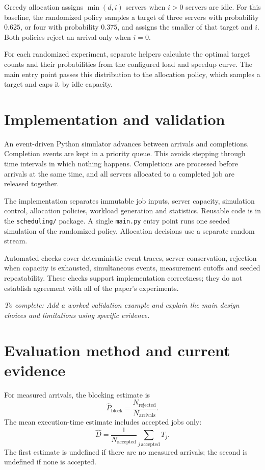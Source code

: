 \documentclass[11pt,a4paper,oneside]{article}
\newcommand{\draftnote}[1]{\par\textit{To complete: #1}\par}
\begin{document}
Greedy allocation assigns $\min(d,i)$ servers when $i>0$ servers are idle.
For this baseline, the randomized policy samples a target of three servers with probability
$0.625$, or four with probability $0.375$, and assigns the smaller of that target
and $i$. Both policies reject an arrival only when $i=0$.

For each randomized experiment, separate helpers calculate the optimal target
counts and their probabilities from the configured load and speedup curve.
The main entry point passes this distribution to the allocation policy, which
samples a target and caps it by idle capacity.

\section{Implementation and validation}

An event-driven Python simulator advances between arrivals and completions.
Completion events are kept in a priority queue. This avoids stepping through time
intervals in which nothing happens. Completions are processed before arrivals at
the same time, and all servers allocated to a completed job are released together.

The implementation separates immutable job inputs, server capacity, simulation control,
allocation policies, workload generation and statistics. Reusable code is in the
\texttt{scheduling/} package. A single \texttt{main.py} entry point runs one seeded
simulation of the randomized policy. Allocation decisions use
a separate random stream.

Automated checks cover deterministic event traces, server conservation, rejection
when capacity is exhausted, simultaneous events, measurement cutoffs and seeded
repeatability. These checks support
implementation correctness; they do not establish agreement with all of the
paper's experiments.

\draftnote{Add a worked validation example and explain the main design choices
and limitations using specific evidence.}

\section{Evaluation method and current evidence}

For measured arrivals, the blocking estimate is
\begin{equation}
  \widehat{P}_{\mathrm{block}}
  = \frac{N_{\mathrm{rejected}}}{N_{\mathrm{arrivals}}}.
\end{equation}
The mean execution-time estimate includes accepted jobs only:
\begin{equation}
  \widehat{D}
  = \frac{1}{N_{\mathrm{accepted}}}
    \sum_{j\,\mathrm{accepted}} T_j.
\end{equation}
The first estimate is undefined if there are no measured arrivals; the second is
undefined if none is accepted.
\end{document}
